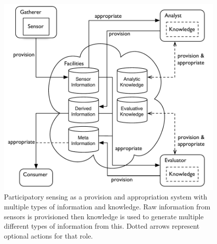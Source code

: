 \begin{figure}
\caption[Participatory sensing as a provision and appropriation with multiple types of information and knowledge.]{Participatory sensing as a provision and appropriation system with multiple types of information and knowledge. Raw information from sensors is provisioned then knowledge is used to generate multiple different types of information from this. Dotted arrows represent optional actions for that role.}\label{fig:psysex}
\includegraphics[width=\linewidth]{gfx/Prov_and_app_sys_diag_expanded}
\end{figure}




